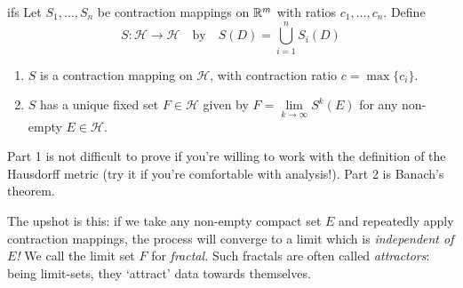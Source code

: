 \begin{thm}{}{ifs}
Let $S_1,\ldots,S_n$ be contraction mappings on $\mathbb{R}^m$ with ratios $c_1,\ldots,c_n$. Define
\[S:\mathcal H\to\mathcal H\quad\text{by}\quad S(D)=\bigcup_{i=1}^nS_i(D)\]
\begin{enumerate}
  \item $S$ is a contraction mapping on $\mathcal H$, with contraction ratio $c=\max\{c_i\}$.
  \item $S$ has a unique fixed set $F\in\mathcal H$ given by $F=\lim\limits_{k\to\infty} S^k(E)$ for any non-empty $E\in\mathcal H$.
\end{enumerate}
\end{thm}

Part 1 is not difficult to prove if you're willing to work with the definition of the Hausdorff metric (try it if you're comfortable with analysis!). Part 2 is Banach's theorem.\smallbreak

The upshot is this: if we take any non-empty compact set $E$ and repeatedly apply contraction mappings, the process will converge to a limit which is \emph{independent of $E$!} We call the limit set $F$ for \emph{fractal.} Such fractals are often called \emph{attractors}: being limit-sets, they `attract' data towards themselves.

\goodbreak


